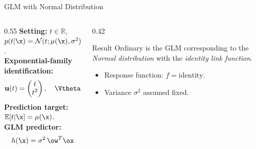 \begin{frame}{GLM with Normal Distribution}
  \begin{columns}[T]
    \begin{column}{0.55\textwidth}
      \textbf{Setting:} $t \in \mathbb{R}$, $p(t|\x) = \mathcal{N}(t;\mu(\x),\sigma^2)$.\\[0.4em]
      \textbf{Exponential-family identification:}
      \[
        \mathbf{u}(t) = \begin{pmatrix}t \\ t^2\end{pmatrix},\quad
        \Vtheta(\x) = \begin{pmatrix}\mu(\x)/\sigma^2 \\ -1/(2\sigma^2)\end{pmatrix}
      \]
      \textbf{Prediction target:} $\mathbb{E}[t|\x] = \mu(\x)$.\\[0.4em]
      \textbf{GLM predictor:}
      \[
        h(\x) = \sigma^2\,\ow^T\ox
      \]
    \end{column}
    \begin{column}{0.42\textwidth}
      \begin{block}{Result}
        Ordinary  is the GLM corresponding to the \emph{Normal distribution} with the \emph{identity link function}.
      \end{block}
      \vspace{0.3em}
      \begin{itemize}
        \item Response function: $f = \text{identity}$.
        \item Variance $\sigma^2$ assumed fixed.
      \end{itemize}
    \end{column}
  \end{columns}
\end{frame}

